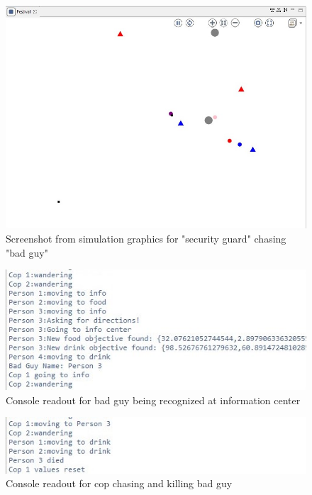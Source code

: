 \documentclass[a4paper]{article}
\begin{document}
\begin{figure}[H]
    \centering
    \includegraphics[scale=0.5]{cop chase.jpg}
    \caption{Screenshot from simulation graphics for "security guard" chasing "bad guy"} 
    \label{fig:cop_chase}
\end{figure}

\begin{figure}[H]
    \centering
    \includegraphics[scale=0.7]{bad guy info center console.jpg}
    \caption{Console readout for bad guy being recognized at information center}
    \label{fig:bad_guy_info}
\end{figure}

\begin{figure}[H]
    \centering
    \includegraphics[scale=0.7]{cop kills.jpg}
    \caption{Console readout for cop chasing and killing bad guy}
    \label{fig:cop_kills}
\end{figure}
\end{document}
